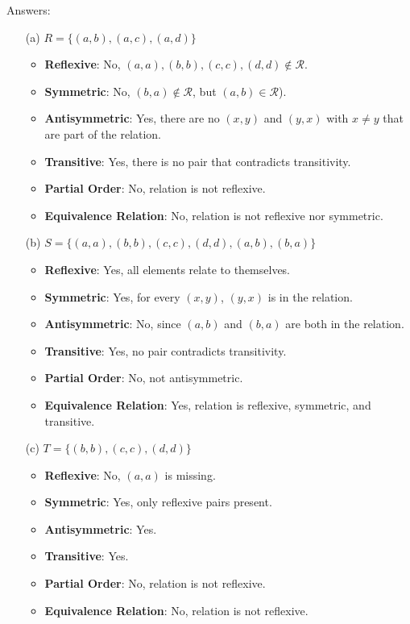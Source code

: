 \documentclass{article}
\begin{document}
Answers:
\begin{enumerate}
    \item[(a)] \( R = \{(a, b), (a, c), (a, d)\} \)
    \begin{itemize}
        \item \textbf{Reflexive}: No, $(a,a), (b,b), (c,c), (d,d) \notin \mathcal{R}$.
        \item \textbf{Symmetric}: No, $(b,a) \notin \mathcal{R}$, but $(a,b)\in \mathcal{R}$).
        \item \textbf{Antisymmetric}: Yes, there are 
 no \((x, y) \) and \((y, x) \) with \( x \neq y \) that are part of the relation.
        \item \textbf{Transitive}: Yes, there is no pair that contradicts transitivity.
        \item \textbf{Partial Order}: No, relation is not reflexive.
        \item \textbf{Equivalence Relation}: No, relation is not reflexive nor symmetric.
    \end{itemize}

    \item[(b)] \( S = \{(a, a), (b, b), (c, c), (d, d), (a, b), (b, a)\} \)
    \begin{itemize}
        \item \textbf{Reflexive}: Yes, all elements relate to themselves.
        \item \textbf{Symmetric}: Yes, for every \((x, y) \), \((y, x) \) is in the relation.
        \item \textbf{Antisymmetric}: No, since \((a, b) \) and \((b, a) \) are both in the relation.
        \item \textbf{Transitive}: Yes, no pair contradicts transitivity. 
        \item \textbf{Partial Order}: No, not antisymmetric.
        \item \textbf{Equivalence Relation}: Yes, relation is reflexive, symmetric, and transitive.
    \end{itemize}

    \item[(c)] \( T = \{(b, b), (c, c), (d, d)\} \)
    \begin{itemize}
        \item \textbf{Reflexive}: No, \( (a, a) \) is missing.
        \item \textbf{Symmetric}: Yes, only reflexive pairs present.
        \item \textbf{Antisymmetric}: Yes.
        \item \textbf{Transitive}: Yes.
        \item \textbf{Partial Order}: No, relation is not reflexive.
        \item \textbf{Equivalence Relation}: No, relation is not reflexive.
    \end{itemize}


\end{enumerate}
\end{document}
